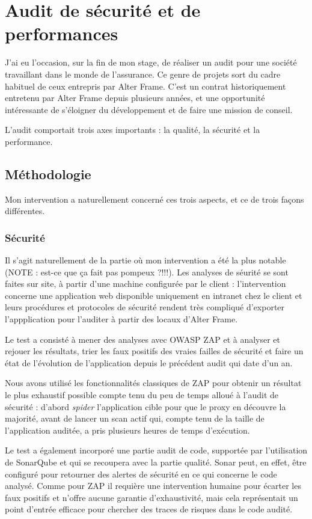 \section{Audit de sécurité et de performances}
\label{sec:audit}
J'ai eu l'occasion, sur la fin de mon stage, de réaliser un audit pour une société travaillant dans le monde de l'assurance. Ce genre de projets sort du cadre habituel de ceux entrepris par Alter Frame. C'est un contrat historiquement entretenu par Alter Frame depuis plusieurs années, et une opportunité intéressante de s'éloigner du développement et de faire une mission de conseil. 

L'audit comportait trois axes importants : la qualité, la sécurité et la performance. 

\subsection{Méthodologie}
Mon intervention a naturellement concerné ces trois aspects, et ce de trois façons différentes. 

\subsubsection{Sécurité}
Il s'agit naturellement de la partie où mon intervention a été la plus notable (NOTE : est-ce que ça fait pas pompeux ?!!!). Les analyses de séurité se sont faites sur site, à partir d'une machine configurée par le client : l'intervention concerne une application web disponible uniquement en intranet chez le client et leurs procédures et protocoles de sécurité rendent très compliqué d'exporter l'appplication pour l'auditer à partir des locaux d'Alter Frame. 

Le test a consisté à mener des analyses avec OWASP ZAP et à analyser et rejouer les résultats, trier les faux positifs des vraies failles de sécurité et faire un état de l'évolution de l'application depuis le précédent audit qui date d'un an. 

Nous avons utilisé les fonctionnalités classiques de ZAP pour obtenir un résultat le plus exhaustif possible compte tenu du peu de temps alloué à l'audit de sécurité : d'abord \textit{spider} l'application cible pour que le proxy en découvre la majorité, avant de lancer un scan actif qui, compte tenu de la taille de l'application auditée, a pris plusieurs heures de temps d'exécution. 

Le test a également incorporé une partie audit de code, supportée par l'utilisation de SonarQube et qui se recoupera avec la partie qualité. Sonar peut, en effet, être configuré pour retourner des alertes de sécurité en ce qui concerne le code analysé. Comme pour ZAP il requière une intervention humaine pour écarter les faux positifs et n'offre aucune garantie d'exhaustivité, mais cela représentait un point d'entrée efficace pour chercher des traces de risques dans le code audité. 

